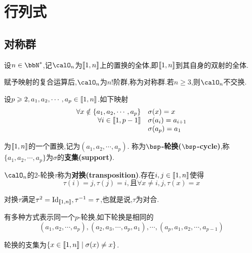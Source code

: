 \chapter{行列式}

\section{对称群}

设$n \in \bbN^*$,记$\calO_n$为$\llbracket 1, n \rrbracket$上的置换的全体,即$\llbracket 1, n \rrbracket$到其自身的双射的全体.

\begin{prop}
    赋予映射的复合运算后,$\calO_n$为$n!$阶群,称为对称群.若$n \geqslant 3$,则$\calO_n$不交换.
\end{prop}

\begin{deff}
    设$p \geqslant 2, a_1, a_2, \cdots, a_p \in \llbracket 1, n \rrbracket$.如下映射
    \[ \begin{array}{rl}
        \forall x \notin \{ a_1, a_2, \cdots, a_p \} & \sigma(x) = x \\
        \forall i \in \llbracket 1, p - 1 \rrbracket & \sigma(a_i) = a_{i + 1} \\
        & \sigma(a_p) = a_1
    \end{array} \]

    为$\llbracket 1, n \rrbracket$的一个置换,记为$(a_1, a_2, \cdots, a_p)$.
    称为\textbf{$\bsp$-轮换($\bsp$-cycle)},称$\{ a_1, a_2, \cdots, a_p \}$为$\sigma$的\textbf{支集(support)}.
\end{deff}

\begin{deff}
    $\calO_n$的2-轮换$\tau$称为\textbf{对换(transposition)}.存在$i, j \in \llbracket 1, n \rrbracket$使得
    \[ \tau(i) = j, \tau(j) = i, \text{且} \forall x \neq i, j, \tau(x) = x \]
\end{deff}

\begin{rqq}
    对换$\tau$满足$\tau^2 = \operatorname{Id}_{\llbracket 1, n \rrbracket}, \tau^{-1} = \tau$,也就是说,$\tau$为对合.
\end{rqq}

\begin{rqq}
    有多种方式表示同一个$p$-轮换,如下轮换是相同的
    \[ (a_1, a_2, \cdots, a_p), (a_2, a_3, \cdots, a_p, a_1), \cdots, (a_p, a_1, a_2, \cdots, a_{p - 1}) \]
\end{rqq}

\begin{rqq}
    轮换的支集为$\{ x \in \llbracket 1, n \rrbracket \mid \sigma(x) \neq x \}$.
\end{rqq}

